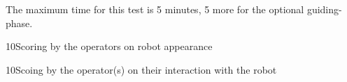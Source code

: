 
The maximum time for this test is 5 minutes, 5 more for the optional guiding-phase.

\begin{scorelist}



	\item{10}{Scoring by the operators on robot appearance}
	\item{10}{Scoing by the operator(s) on their interaction with the robot}
\end{scorelist}

